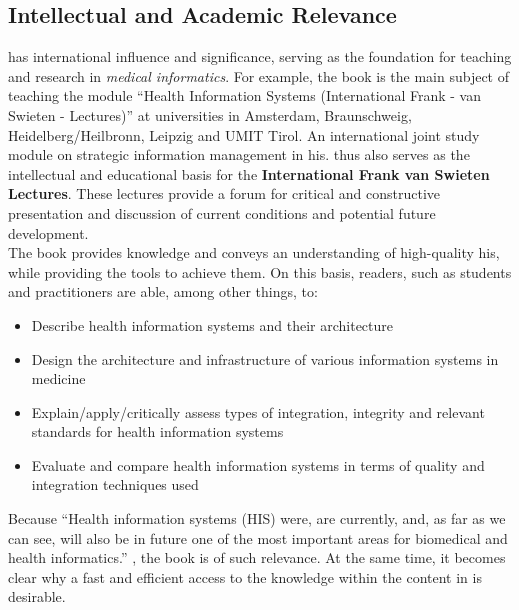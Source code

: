 \subsection{Intellectual and Academic Relevance}
 has international influence and significance, serving as the foundation for teaching and research in \textit{medical informatics}.
For example, the book is the main subject of teaching the module \enquote{Health Information Systems (International Frank - van Swieten - Lectures)} at universities in Amsterdam, Braunschweig, Heidelberg/Heilbronn, Leipzig and UMIT Tirol.
An international joint study module on strategic information management in \ac{his}.
 thus also serves as the intellectual and educational basis for the \textbf{International Frank van Swieten Lectures}.
These lectures provide a forum for critical and constructive presentation and discussion of current conditions and potential future development.\\
The book provides knowledge and conveys an understanding of high-quality \ac{his}, while providing the tools to achieve them.
On this basis, readers, such as students and practitioners are able, among other things, to:
\begin{itemize}
    \item Describe health information systems and their architecture
    \item Design the architecture and infrastructure of various information systems in medicine
    \item Explain/apply/critically assess types of integration, integrity and relevant standards for health information systems
    \item Evaluate and compare health information systems in terms of quality and integration techniques used
\end{itemize}
%
Because \enquote{Health information systems (HIS) were, are currently, and, as far as we can see, will also be in future one of the most important areas for biomedical and health informatics.} \citep[p.e40]{Ammenwerth2017FvS}, the book is of such relevance.
At the same time, it becomes clear why a fast and efficient access to the knowledge within the content in \citet{bb2} is desirable.
%
